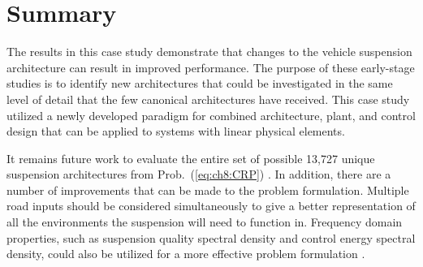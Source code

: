 \section{Summary\label{sec:ch8:conclusion}}

The results in this case study demonstrate that changes to the vehicle suspension architecture can result in improved performance.
The purpose of these early-stage studies is to identify new architectures that could be investigated in the same level of detail that the few canonical architectures have received.
This case study utilized a newly developed paradigm for combined architecture, plant, and control design that can be applied to systems with linear physical elements.

It remains future work to evaluate the entire set of possible 13,727 unique suspension architectures from Prob.~(\ref{eq:ch8:CRP}) \cite{Herber2017a}.
In addition, there are a number of improvements that can be made to the problem formulation.
Multiple road inputs should be considered simultaneously to give a better representation of all the environments the suspension will need to function in.
Frequency domain properties, such as suspension quality spectral density and control energy spectral density, could also be utilized for a more effective problem formulation  \cite{Fathy2003a}.
